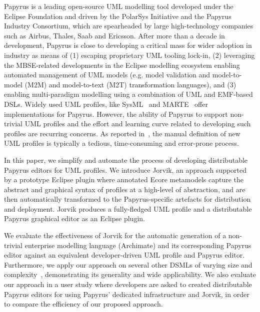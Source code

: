 Papyrus \cite{lanusse2009papyrus} is a leading open-source UML modelling tool developed under the Eclipse Foundation and driven by the PolarSys Initiative and the Papyrus Industry Consortium, which are spearheaded by large high-technology companies such as Airbus, Thales, Saab and Ericsson.  
After more than a decade in development, Papyrus is close to developing a critical mass for wider adoption in industry as means of (1) escaping proprietary UML tooling lock-in, (2) leveraging the MBSE-related developments in the Eclipse modelling ecosystem enabling automated management of UML models (e.g. model validation and model-to-model (M2M) and model-to-text (M2T) transformation languages), and (3) enabling multi-paradigm modelling using a combination of UML and EMF-based DSLs. 
Widely used UML profiles, like SysML~\cite{friedenthal2014practical} and MARTE~\cite{omg2011marte} offer implementations for Papyrus. 
However, the ability of Papyrus to support non-trivial UML profiles and the effort and learning curve related to developing such profiles are recurring concerns. 
As reported in~\cite{Wimmer2009:IJWIS}, the manual definition of new UML profiles is typically a tedious, time-consuming and error-prone process.

In this paper, we simplify and automate the process of developing distributable Papyrus editors for UML profiles. 
We introduce Jorvik, an approach supported by a prototype Eclipse plugin where annotated Ecore metamodels capture the abstract and graphical syntax of profiles at a high-level of abstraction, and are then automatically transformed to the Papyrus-specific artefacts for distribution and deployment. 
Jorvik produces a fully-fledged UML profile and a distributable Papyrus graphical editor as an Eclipse plugin. 

We evaluate the effectiveness of Jorvik for the automatic generation of a non-trivial enterprise modelling language (Archimate) and its corresponding Papyrus editor against an equivalent developer-driven UML profile and Papyrus editor. 
Furthermore, we apply our approach on several other DSMLs of varying size and complexity~\cite{williams2013metamodels}, demonstrating its generality and wide applicability. We also evaluate our approach in a user study where developers are asked to created distributable Papyrus editors for  using Papyrus' dedicated infrastructure and Jorvik, in order to compare the efficiency of our proposed approach.

